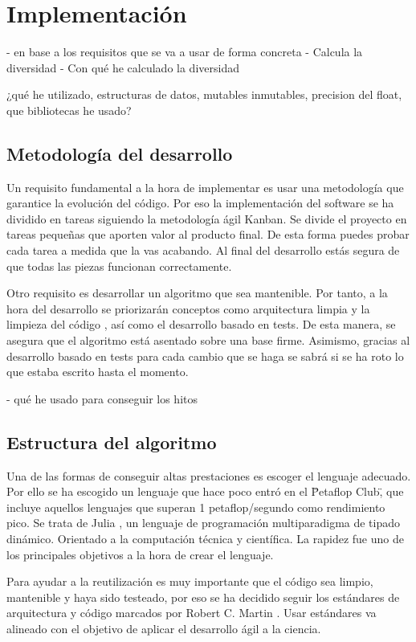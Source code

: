 \chapter{Implementación}

- en base a los requisitos que se va a usar de forma concreta
- Calcula la diversidad - Con qué he calculado la diversidad

¿qué he utilizado, estructuras de datos, mutables inmutables, precision del float, que bibliotecas he usado?

\section{Metodología del desarrollo}

Un requisito fundamental a la hora de implementar es usar una metodología que garantice la evolución del código. Por eso la implementación 
del software se ha dividido en tareas siguiendo la metodología ágil Kanban. Se divide el proyecto en tareas pequeñas que aporten valor al producto 
final. De esta forma puedes probar cada tarea a medida que la vas acabando. Al final del desarrollo estás segura de que todas las piezas funcionan
correctamente.

Otro requisito es desarrollar un algoritmo que sea mantenible. Por tanto, a la hora del desarrollo se priorizarán conceptos 
como arquitectura limpia \cite{cleanArquitecture2017} y la limpieza del código \cite{cleanCode2008}, así como el desarrollo basado en tests. De esta manera, se asegura 
que el algoritmo está asentado sobre una base firme. Asimismo, gracias al desarrollo basado en tests para cada cambio que se haga 
se sabrá si se ha roto lo que estaba escrito hasta el momento. 

- qué he usado para conseguir los hitos
\section{Estructura del algoritmo}

Una de las formas de conseguir altas prestaciones es escoger el lenguaje adecuado. Por ello se ha escogido un lenguaje que
hace poco entró en el \"Petaflop Club\", que incluye aquellos lenguajes que superan 1 petaflop/segundo como rendimiento pico. Se trata
de Julia \cite{julia}, un lenguaje de programación multiparadigma de tipado dinámico. Orientado a la computación técnica y 
científica. La rapidez fue uno de los principales objetivos a la hora de crear el lenguaje. 

Para ayudar a la reutilización es muy importante que el código sea limpio, mantenible y haya sido testeado, por eso se ha decidido seguir los estándares de arquitectura y código marcados 
por Robert C. Martin \cite{cleanArquitecture2017, cleanCode2008}. Usar estándares va alineado con el objetivo de aplicar el desarrollo ágil a la ciencia.
